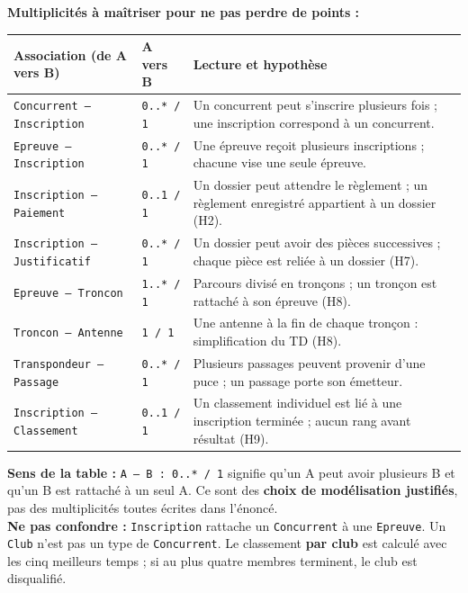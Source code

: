\textbf{Multiplicités à maîtriser pour ne pas perdre de points :}\par\smallskip
\begin{tabularx}{\linewidth}{@{}p{55mm}p{20mm}X@{}}
\toprule
Association (de A vers B) & A vers B & Lecture et hypothèse \\
\midrule
\texttt{Concurrent -- Inscription} & \texttt{0..* / 1} & Un concurrent peut s'inscrire plusieurs fois ; une inscription correspond à un concurrent.\\
\texttt{Epreuve -- Inscription} & \texttt{0..* / 1} & Une épreuve reçoit plusieurs inscriptions ; chacune vise une seule épreuve.\\
\texttt{Inscription -- Paiement} & \texttt{0..1 / 1} & Un dossier peut attendre le règlement ; un règlement enregistré appartient à un dossier (H2).\\
\texttt{Inscription -- Justificatif} & \texttt{0..* / 1} & Un dossier peut avoir des pièces successives ; chaque pièce est reliée à un dossier (H7).\\
\texttt{Epreuve -- Troncon} & \texttt{1..* / 1} & Parcours divisé en tronçons ; un tronçon est rattaché à son épreuve (H8).\\
\texttt{Troncon -- Antenne} & \texttt{1 / 1} & Une antenne à la fin de chaque tronçon : simplification du TD (H8).\\
\texttt{Transpondeur -- Passage} & \texttt{0..* / 1} & Plusieurs passages peuvent provenir d'une puce ; un passage porte son émetteur.\\
\texttt{Inscription -- Classement} & \texttt{0..1 / 1} & Un classement individuel est lié à une inscription terminée ; aucun rang avant résultat (H9).\\
\bottomrule
\end{tabularx}
\textbf{Sens de la table :} \texttt{A -- B : 0..* / 1} signifie qu'un A peut avoir plusieurs B et qu'un B est rattaché à un seul A. Ce sont des \textbf{choix de modélisation justifiés}, pas des multiplicités toutes écrites dans l'énoncé.\\
\textbf{Ne pas confondre :} \texttt{Inscription} rattache un \texttt{Concurrent} à une \texttt{Epreuve}. Un \texttt{Club} n'est pas un type de \texttt{Concurrent}. Le classement \textbf{par club} est calculé avec les cinq meilleurs temps ; si au plus quatre membres terminent, le club est disqualifié.

